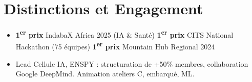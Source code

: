 \documentclass[a4paper,11pt]{article}
\begin{document}
\section{Distinctions et Engagement}
\begin{itemize}[leftmargin=*, nosep, label=\tiny$\bullet$]
    \item \small{\textbf{1\textsuperscript{er} prix} IndabaX Africa 2025 (IA \& Santé) \quad \textbf{1\textsuperscript{er} prix} CITS National Hackathon (75 équipes) \quad \textbf{1\textsuperscript{er} prix} Mountain Hub Regional 2024}
    \item \small{Lead Cellule IA, ENSPY : structuration de +50\% membres, collaboration Google DeepMind. Animation ateliers C, embarqué, ML.}
\end{itemize}
\end{document}
